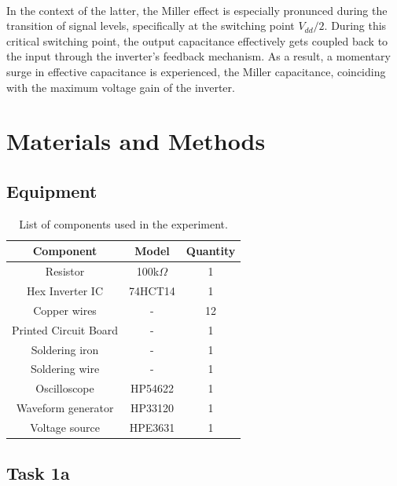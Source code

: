 \documentclass[onecolumn]{article}
\begin{document}
\paragraph{} In the context of the latter, the Miller effect is especially pronunced during the transition of signal levels, specifically at the switching point $V_{dd}/2$. During this critical switching point, the output capacitance effectively gets coupled back to the input through the inverter's feedback mechanism. As a result, a momentary surge in effective capacitance is experienced, the Miller capacitance, coinciding with the maximum voltage gain of the inverter.


\section{Materials and Methods}
\subsection{Equipment}
\begin{table}[h!]
    \centering
    \begin{tabular}{|c|c|c|}
        \hline
        \textbf{Component} & \textbf{Model} & \textbf{Quantity} \\
        \hline
        Resistor & 100k$\Omega$ & 1 \\
        Hex Inverter IC & 74HCT14 & 1 \\
        Copper wires & - & 12 \\
        Printed Circuit Board & - & 1 \\
        Soldering iron & - & 1 \\
        Soldering wire & - & 1 \\
        Oscilloscope & HP54622 & 1 \\
        Waveform generator  & HP33120 & 1 \\
        Voltage source & HPE3631 & 1 \\ 
        \hline
    \end{tabular}
    \caption{List of components used in the experiment.}
    \label{tab:bom}
\end{table}

\subsection{Task 1a}
\end{document}
